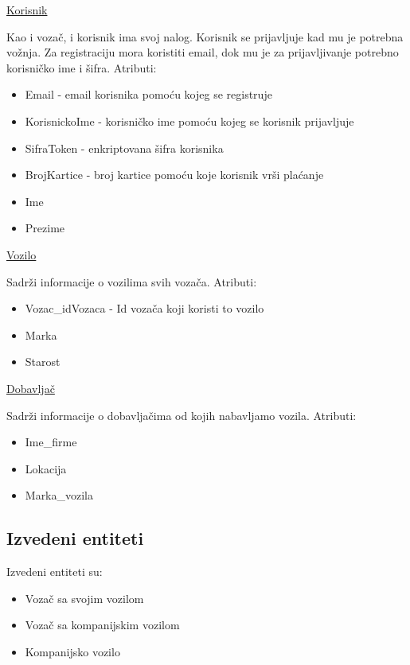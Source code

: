 \begin{flushleft}
\underline{Korisnik}
\end{flushleft}
Kao i vozač, i korisnik ima svoj nalog. Korisnik se prijavljuje kad mu je potrebna vožnja. Za registraciju mora koristiti email, dok mu je za prijavljivanje potrebno korisničko ime i šifra. Atributi:
\begin{itemize}
    \item Email - email korisnika pomoću kojeg se registruje
    \item KorisnickoIme - korisničko ime pomoću kojeg se korisnik prijavljuje
    \item SifraToken - enkriptovana šifra korisnika
    \item BrojKartice - broj kartice pomoću koje korisnik vrši plaćanje
    \item Ime
    \item Prezime
\end{itemize}

\begin{flushleft}
\underline{Vozilo}
\end{flushleft}
Sadrži informacije o vozilima svih vozača. Atributi:
\begin{itemize}
    \item Vozac\_idVozaca - Id vozača koji koristi to vozilo
    \item Marka
    \item Starost
\end{itemize}

\begin{flushleft}
\underline{Dobavljač}
\end{flushleft}
Sadrži informacije o dobavljačima od kojih nabavljamo vozila. Atributi:
\begin{itemize}
    \item Ime\_firme
    \item Lokacija
    \item Marka\_vozila
\end{itemize}


\subsection{\textbf{Izvedeni entiteti}}
Izvedeni entiteti su:
\begin{itemize}
    \item Vozač sa svojim vozilom
    \item Vozač sa kompanijskim vozilom
    \item Kompanijsko vozilo
\end{itemize}

